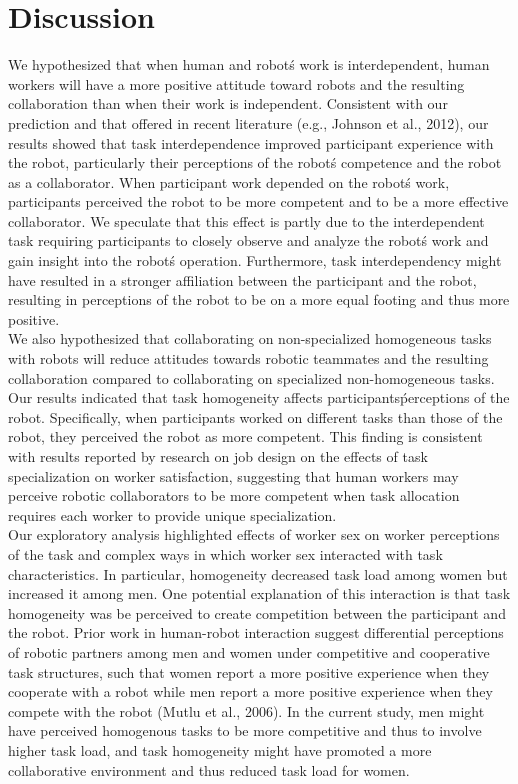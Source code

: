 \section{Discussion}
        We hypothesized that when human and robot\' s work is interdependent, human workers will have a more positive attitude toward robots and the resulting collaboration than when their work is independent. Consistent with our prediction and that offered in recent literature (e.g., Johnson et al., 2012), our results showed that task interdependence improved participant experience with the robot, particularly their perceptions of the robot\' s competence and the robot as a collaborator. When participant work depended on the robot\' s work, participants perceived the robot to be more competent and to be a more effective collaborator. We speculate that this effect is partly due to the interdependent task requiring participants to closely observe and analyze the robot\' s work and gain insight into the robot\' s operation. Furthermore, task interdependency might have resulted in a stronger affiliation between the participant and the robot, resulting in perceptions of the robot to be on a more equal footing and thus more positive. \\
       We also hypothesized that collaborating on non-specialized homogeneous tasks with robots will reduce attitudes towards robotic teammates and the resulting collaboration compared to collaborating on specialized non-homogeneous tasks. Our results indicated that task homogeneity affects participants\'  perceptions of the robot. Specifically, when participants worked on different tasks than those of the robot, they perceived the robot as more competent. This finding is consistent with results reported by research on job design on the effects of task specialization on worker satisfaction, suggesting that human workers may perceive robotic collaborators to be more competent when task allocation requires each worker to provide unique specialization.\\
       Our exploratory analysis highlighted effects of worker sex on worker perceptions of the task and complex ways in which worker sex interacted with task characteristics. In particular, homogeneity decreased task load among women but increased it among men. One potential explanation of this interaction is that task homogeneity was be perceived to create competition between the participant and the robot. Prior work in human-robot interaction suggest differential perceptions of robotic partners among men and women under competitive and cooperative task structures, such that women report a more positive experience when they cooperate with a robot while men report a more positive experience when they compete with the robot (Mutlu et al., 2006). In the current study, men might have perceived homogenous tasks to be more competitive and thus to involve higher task load, and task homogeneity might have promoted a more collaborative environment and thus reduced task load for women.\\ 
